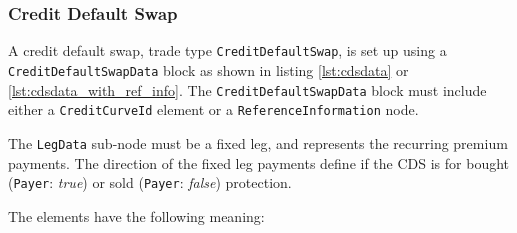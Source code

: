\subsubsection{Credit Default Swap}

A credit default swap, trade type \lstinline!CreditDefaultSwap!, is set up using a \lstinline!CreditDefaultSwapData! block as shown in listing \ref{lst:cdsdata} or \ref{lst:cdsdata_with_ref_info}. The \lstinline!CreditDefaultSwapData! block must include either a \lstinline!CreditCurveId! element or a \lstinline!ReferenceInformation! node. 

The {\tt LegData} sub-node must be a fixed leg, and  represents the recurring premium payments. The direction of the fixed leg payments define if the CDS is for bought (\lstinline!Payer!: \emph{true}) or sold (\lstinline!Payer!: \emph{false}) protection.

The elements have the following meaning:

